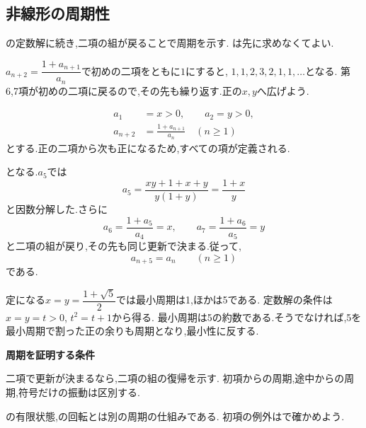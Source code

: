 \subsection{非線形の周期性}\label{節：非線形の周期性}
の定数解に続き,二項の組が戻ることで周期を示す.
は先に求めなくてよい.

$a_{n+2}=\dfrac{1+a_{n+1}}{a_n}$で初めの二項をともに$1$にすると,
$1,1,2,3,2,1,1,\ldots$となる.
第6,7項が初めの二項に戻るので,その先も繰り返す.正の$x,y$へ広げよう.

\[
  \begin{aligned}
    a_1&=x>0,\qquad a_2=y>0,\\
    a_{n+2}&=\frac{1+a_{n+1}}{a_n}\quad(n\ge1)
  \end{aligned}
\]
とする.正の二項から次も正になるため,すべての項が定義される.

\BookMathLayout{\[
    a_3=\frac{1+y}{x},\qquad
    a_4=\frac{1+x+y}{xy},\qquad
    a_5=\frac{1+x}{y}
  \]}{\[
    \begin{aligned}
      a_3&=\frac{1+y}{x},\\
      a_4&=\frac{1+x+y}{xy},\\
      a_5&=\frac{1+x}{y}
    \end{aligned}
  \]}
となる.$a_5$では
\[
  a_5=\frac{xy+1+x+y}{y(1+y)}=\frac{1+x}{y}
\]
と因数分解した.さらに
\[
  a_6=\frac{1+a_5}{a_4}=x,\qquad
  a_7=\frac{1+a_6}{a_5}=y
\]
と二項の組が戻り,その先も同じ更新で決まる.従って,
\[
  a_{n+5}=a_n\qquad(n\ge1)
\]
である.

定になる$x=y=\dfrac{1+\sqrt5}{2}$では最小周期は1,ほかは5である.
定数解の条件は$x=y=t>0$, $t^2=t+1$から得る.
最小周期は5の約数である.そうでなければ,5を最小周期で割った正の余りも周期となり,最小性に反する.

\begin{bookpoint}
  \textbf{周期を証明する条件}\par
  二項で更新が決まるなら,二項の組の復帰を示す.
  初項からの周期,途中からの周期,符号だけの振動は区別する.
\end{bookpoint}
の有限状態,の回転とは別の周期の仕組みである.
初項の例外はで確かめよう.
